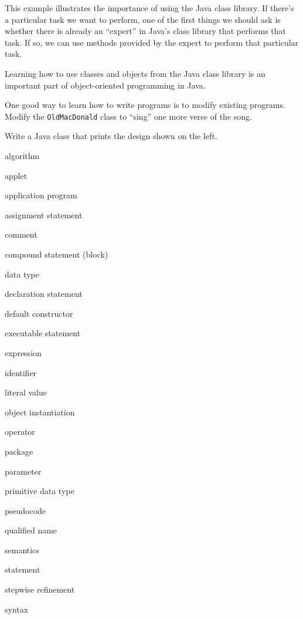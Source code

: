 This example illustrates the importance of using the Java class
library.  If there's a particular task we want to perform, one of the
first things we should ask is whether there is already an ``expert''
in Java's class library that performs that task.  If so, we can use
methods provided by the expert to perform that particular task.

 {Learning how to use
classes and objects from the Java class library is an important
part of object-oriented programming in Java.}

\begin{SSTUDY}
\marginnote{\small\tt
**********\\
\mbox{*}\mbox{ }**\mbox{ }\mbox{ }**\mbox{ }*\\
\mbox{*}\mbox{ }\mbox{ }\mbox{ }**\mbox{ }\mbox{ }\mbox{ }*\\
\mbox{*}\mbox{ }*\mbox{ }\mbox{ }\mbox{ }\mbox{ }*\mbox{ }*\\
\mbox{*}\mbox{ }\mbox{ }****\mbox{ }\mbox{ }*\\
\mbox{*}*********
}

\item One good way to learn how to write programs is to modify existing
programs.   Modify the {\tt OldMacDonald} class to ``sing'' one more
verse of the song.

\item Write a Java class that prints the design shown on the left.

\end{SSTUDY}

\begin{KT}
algorithm

applet

application program

assignment statement

comment 

compound statement (block)

data type

declaration statement

default constructor

executable statement

expression

identifier

literal value

object instantiation

operator

package

parameter

primitive data type

pseudocode

qualified name

semantics

statement

stepwise refinement

syntax

\end{KT}



